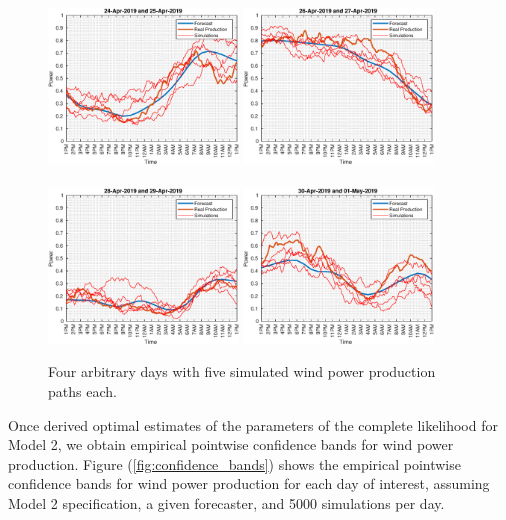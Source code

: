 \documentclass[11pt]{article}
\theoremstyle{definition}
\begin{document}
\begin{figure}[H]
\centering
\includegraphics[width=0.45\textwidth]{../../MATLAB_Files/Results/paths_testing_days/optimal_value/withDate/1.eps}
\includegraphics[width=0.45\textwidth]{../../MATLAB_Files/Results/paths_testing_days/optimal_value/withDate/2.eps}\\
\quad\\
\includegraphics[width=0.45\textwidth]{../../MATLAB_Files/Results/paths_testing_days/optimal_value/withDate/3.eps}
\includegraphics[width=0.45\textwidth]{../../MATLAB_Files/Results/paths_testing_days/optimal_value/withDate/4.eps}
\caption{Four arbitrary days with five simulated wind power production paths each.}
\label{fig:simulation_paths}
\end{figure}
Once derived optimal estimates of the parameters of the complete likelihood for Model 2, we obtain empirical pointwise confidence bands for wind power production. Figure (\ref{fig:confidence_bands}) shows the empirical pointwise confidence bands for wind power production for each day of interest, assuming Model 2 specification, a given forecaster, and 5000 simulations per day.
\end{document}
